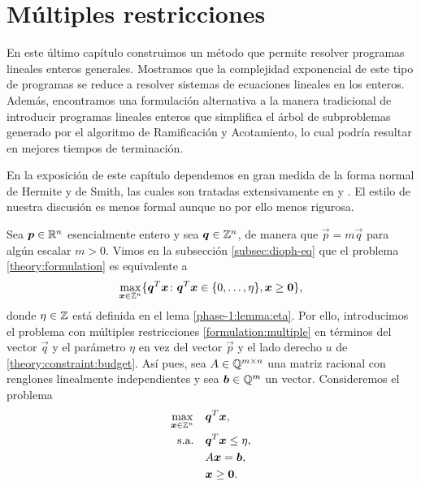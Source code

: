 \chapter{Múltiples restricciones}
\noindent
En este último capítulo construimos un método que permite resolver programas lineales enteros
generales. Mostramos que la complejidad exponencial de este tipo de programas se reduce a resolver
sistemas de ecuaciones lineales en los enteros. Además, encontramos una formulación alternativa a la
manera tradicional de introducir programas lineales enteros que simplifica el árbol de subproblemas
generado por el algoritmo de Ramificación y Acotamiento, lo cual podría resultar en mejores tiempos de
terminación.

En la exposición de este capítulo dependemos en gran medida de la forma normal de Hermite y de
Smith, las cuales son tratadas extensivamente en \cite{alex} y \cite{morris}. El estilo de nuestra
discusión es menos formal aunque no por ello menos rigurosa.

Sea $\boldsymbol{p} \in \mathbb{R}^n$ esencialmente entero y sea $\boldsymbol{q} \in \mathbb{Z}^n$, de manera que $\vec{p} =
m\vec{q}$ para algún escalar $m > 0$. Vimos en la subsección \ref{subsec:dioph-eq} que el problema
\eqref{theory:formulation} es equivalente a
\begin{equation*}
	\max_{\boldsymbol{x} \in \mathbb{Z}^n}
	\lbrace \boldsymbol{q}^T\boldsymbol{x} \colon \boldsymbol{q}^T\boldsymbol{x} \in \lbrace 0, \ldots, \eta \rbrace, \boldsymbol{x}
	\geq \boldsymbol{0} \rbrace,
\end{equation*}
donde $\eta \in \mathbb{Z}$ está definida en el lema \ref{phase-1:lemma:eta}. Por ello, introducimos el
problema con múltiples restricciones \eqref{formulation:multiple} en términos del vector $\vec{q}$ y
el parámetro $\eta$ en vez del vector $\vec{p}$ y el lado derecho $u$ de
\eqref{theory:constraint:budget}. Así pues, sea $A \in \mathbb{Q}^{m \times n}$ una matriz racional con
renglones linealmente independientes y sea $\boldsymbol{b} \in \mathbb{Q}^m$ un vector. Consideremos el problema
\begin{subequations}
	\label{formulation:multiple}
	\begin{align}
		\max_{\boldsymbol{x} \in \mathbb{Z}^n} \quad
			& \boldsymbol{q}^T\boldsymbol{x}, \label{formulation:multiple:objective} \\
		\text{s.a.} \quad
			& \boldsymbol{q}^T\boldsymbol{x} \leq \eta, \label{formulation:multiple:constraint:budget} \\
			& A\boldsymbol{x} = \boldsymbol{b}, \label{formulation:multiple:constraints} \\
			& \boldsymbol{x} \geq \boldsymbol{0}. \nonumber
	\end{align}
\end{subequations}


